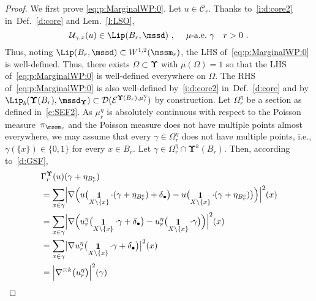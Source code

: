 \documentclass[11pt,letterpaper]{amsart}
\renewcommand{\complement}{\mathrm{c}}
\newcommand{\dom}[1]{\mathcal D(#1)}
\newcommand{\set}[1]{\left\{#1\right\}}							%
\newcommand{\paren}[1]{\left(#1\right)}							%
\newcommand{\tparen}[1]{\big({#1}\big)}
\DeclareMathOperator{\car}{\mathbf 1}
\newcommand{\comma}{\,\,\mathrm{,}\;\,}
\newcommand{\fstop}{\,\,\mathrm{.}}
\newcommand{\cdc}{\Gamma}
\newcommand{\QP}{{\mu}}
\newcommand{\dUpsilon}{{\mathbf \Upsilon}}
\newcommand{\U}{\dUpsilon}
\newcommand{\E}{\mathcal E}
\renewcommand{\1}{\mathbf 1}
\numberwithin{equation}{section}
\theoremstyle{plain}
\theoremstyle{definition}
\theoremstyle{remark}
\begin{document}
\begin{proof}
We first prove \eqref{eq:p:MarginalWP:0}. Let $u \in \mathcal C_r$. Thanks to~\ref{i:d:core2} in~Def.~\ref{d:core} and Lem.~\ref{l:LSO},    
$$\mathcal U_{\gamma, x}(u) \in \Lip(B_r, \mssd) \comma \quad   \QP\text{-a.e.}\ \gamma \quad r>0 \fstop$$
Thus, noting $\Lip(B_r, \mssd) \subset W^{1,2}(\mssm_r)$, the LHS of~\eqref{eq:p:MarginalWP:0} is well-defined. Thus, there exists $\Omega \subset \U$ with $\QP(\Omega)=1$ so that the LHS of~\eqref{eq:p:MarginalWP:0} is well-defined everywhere on $\Omega$. 
The RHS of~\eqref{eq:p:MarginalWP:0} is also well-defined by~\ref{i:d:core2} in~Def.~\ref{d:core} and by $\Lip_b(\U(B_r), \mssd_\U) \subset \dom{\E^{\U(B_r), \mu_r^\eta}}$ by construction. 
Let $\Omega_r^\eta$ be a section as defined in~\eqref{e:SEF2}. 
 As $\mu_r^\eta$ is absolutely continuous with respect to the Poisson measure~$\pi_{\mssm_r}$ and the Poisson measure does not have multiple points almost everywhere, we may assume that every $\gamma \in \Omega_r^\eta$ does not have multiple points, i.e., $\gamma(\{x\}) \in \{0, 1\}$ for every $x \in B_r$. 
Let $\gamma \in \Omega_r^\eta \cap \U^k(B_r)$. Then, according to~\eqref{d:GSF}, 
\begin{align*}
&\cdc^\dUpsilon_r(u) (\gamma+\eta_{B_r^\complement})
\\
&= \sum_{x\in\gamma} \Bigl|\nabla \Bigl( u\tparen{\car_{X\setminus \set{x}} \cdot(\gamma+\eta_{B_r^c})+\delta_\bullet}-u\tparen{\car_{X\setminus\set{x}}\cdot(\gamma+\eta_{B_r^c})} \Bigr)\Bigl|^2(x) 
\\
&=\sum_{x\in\gamma}  \Bigl|\nabla \Bigl( u_{r}^{\eta}\tparen{\car_{X\setminus \set{x}} \cdot\gamma+\delta_\bullet}-u^\eta_{r}\tparen{\car_{X\setminus\set{x}}\cdot\gamma} \Bigr)\Bigr|^2(x) 
\\
&=  \sum_{x\in\gamma} \bigl|\nabla u_{r}^{\eta}\tparen{\car_{X\setminus \set{x}} \cdot\gamma+\delta_\bullet}\bigr|^2(x)
\\
&=  \Bigl|\nabla^{\odot k} \bigl(u_r^\eta \bigr)\Bigr|^2(\gamma)
\\

\end{align*}
\end{proof}
\end{document}
